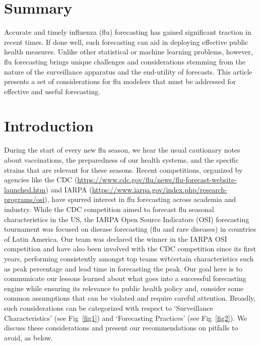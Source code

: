 \documentclass[10pt,letterpaper]{article}
\begin{document}
\section*{Summary}
Accurate and timely influenza (flu) forecasting has gained significant traction
in recent times. If done well, such forecasting can aid in deploying effective
public health measures. Unlike other statistical or machine learning problems,
however, flu forecasting brings unique challenges and considerations stemming
from the nature of the surveillance apparatus and the end-utility of forecasts.
This article presents a set of considerations for flu modelers that must be
addressed for effective and useful forecasting.



\linenumbers

\section*{Introduction}
During the start of every new flu season, we hear the usual cautionary notes about
vaccinations, the preparedness of our health systems, and the specific strains
that are relevant for these seasons.  Recent competitions, organized by
agencies like the CDC (\url{https://www.cdc.gov/flu/news/flu-forecast-website-launched.htm})
and IARPA (\url{https://www.iarpa.gov/index.php/research-programs/osi}),
have spurred interest in flu forecasting across academia and industry.
While the CDC competition aimed to forecast flu seasonal characteristics in the
US, the IARPA Open Source Indicators (OSI) forecasting tournament was focused
on disease forecasting (flu and rare diseases) in countries of Latin America.
Our team was declared the winner in the IARPA OSI competition and have also
been involved with the CDC competition since its first years, performing
consistently amongst top teams w\.r\.t\. certain characteristics such as peak
percentage and lead time in forecasting the peak.
Our goal here is to communicate our lessons learned about what goes into a
successful forecasting engine while ensuring its relevance to public health
policy and, consider some common assumptions that can be violated and require
careful attention.
Broadly, such considerations can be categorized with respect to  `Surveillance
Characteristics' (see Fig~\ref{fig1}) and `Forecasting Practices' (see
Fig~\ref{fig2}). We discuss these considerations and present our recommendations on 
pitfalls to avoid, as below.
\end{document}
